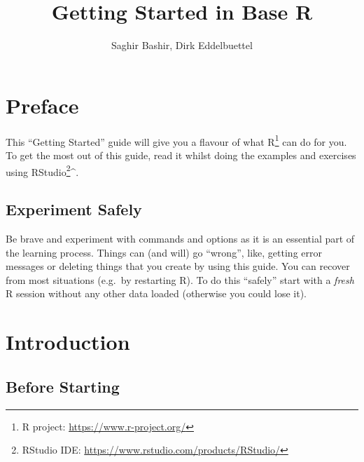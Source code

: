 \documentclass[letterpaperpaper,9pt,twocolumn,twoside,printwatermark=false]{pinp}
\title{Getting Started in Base R}
\author[]{Saghir Bashir, Dirk Eddelbuettel}
\begin{document}
\verticaladjustment{-2pt}

\maketitle
\thispagestyle{firststyle}



\hypertarget{preface}{%
\section{Preface}\label{preface}}

This ``Getting Started'' guide will give you a flavour of what
R\footnote{R project: \url{https://www.r-project.org/}} can do for you.
To get the most out of this guide, read it whilst doing the examples and
exercises using RStudio\footnote{RStudio IDE:
  \url{https://www.rstudio.com/products/RStudio/}}\^{}.

\hypertarget{experiment-safely}{%
\subsection{Experiment Safely}\label{experiment-safely}}

Be brave and experiment with commands and options as it is an essential
part of the learning process. Things can (and will) go ``wrong'', like,
getting error messages or deleting things that you create by using this
guide. You can recover from most situations (e.g.~by restarting R). To
do this ``safely'' start with a \emph{fresh} R session without any other
data loaded (otherwise you could lose it).

\hypertarget{introduction}{%
\section{Introduction}\label{introduction}}

\hypertarget{before-starting}{%
\subsection{Before Starting}\label{before-starting}}
\end{document}
